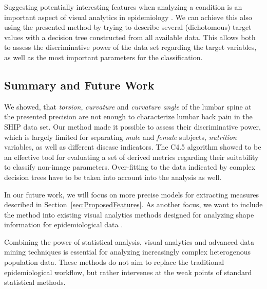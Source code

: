 \documentclass[a4paper,twoside]{style/article}
\begin{document}
Suggesting potentially interesting features when analyzing a condition is an important aspect of visual analytics in epidemiology \cite{Klemm2014VIS}.
We can achieve this also using the presented method by trying to describe several (dichotomous) target values with a decision tree constructed from all available data.
This allows both to assess the discriminative power of the data set regarding the target variables, as well as the most important parameters for the classification.

\subsection{Summary and Future Work}
\noindent We showed, that \emph{torsion}, \emph{curvature} and \emph{curvature angle} of the lumbar spine at the presented precision are not enough to characterize lumbar back pain in the SHIP data set.
Our method made it possible to assess their discriminative power, which is largely limited for separating \emph{male} and \emph{female} subjects, \emph{nutrition} variables, as well as different disease indicators.
The C4.5 algorithm showed to be an effective tool for evaluating a set of derived metrics regarding their suitability to classify non-image parameters.
Over-fitting to the data indicated by complex decision trees have to be taken into account into the analysis as well.

In our future work, we will focus on more precise models for extracting measures described in Section~\ref{sec:ProposedFeatures}.
As another focus, we want to include the method into existing visual analytics methods designed for analyzing shape information for epidemiological data \cite{Klemm2014VIS}.

Combining the power of statistical analysis, visual analytics and advanced data mining techniques is essential for analyzing increasingly complex heterogenous population data.
These methods do not aim to replace the traditional epidemiological workflow, but rather intervenes at the weak points of standard statistical methods.
\end{document}
